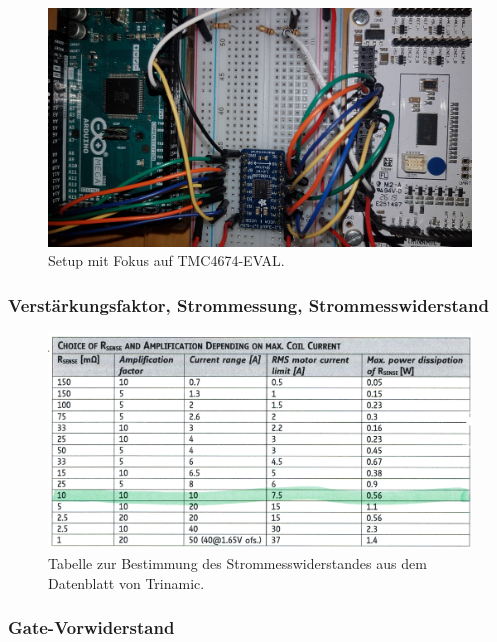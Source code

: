 \begin{figure}[H]
	\centering
	\includegraphics[angle = 180,width=\textwidth]{graphics/2_EVAL}
	\caption{Setup mit Fokus auf TMC4674-EVAL.}
	\label{fig:2_EVAL}
\end{figure}

\subsubsection{Verstärkungsfaktor, Strommessung, Strommesswiderstand}\label{Appendix:Shunt}

\begin{figure}[H]
	\centering
	\includegraphics[width=\textwidth]{graphics/Tabelle_Shunts.png}
	\caption{Tabelle zur Bestimmung des Strommesswiderstandes aus dem Datenblatt von Trinamic.\cite[S.31]{trinamicmotion_control_gmbh__co_kg_tmc6200_2019}}
	\label{fig:Tabelle_Shunts}
\end{figure}

\subsubsection{Gate-Vorwiderstand}\label{Appendix:Gate_Vorwiderstand}

